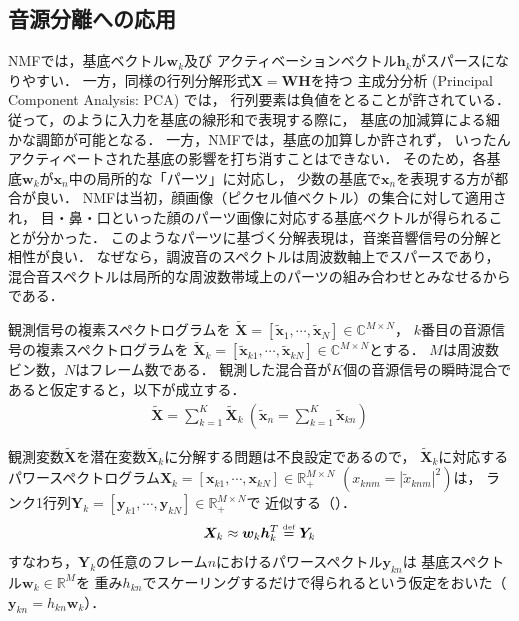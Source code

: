 \subsection{音源分離への応用}
\label{sec:nmf_separation}

NMFでは，基底ベクトル$\bm{w}_k$及び
アクティベーションベクトル$\bm{h}_k$がスパースになりやすい．
一方，同様の行列分解形式$\bm{X} = \bm{W}\bm{H}$を持つ
主成分分析 (Principal Component Analysis: PCA) では，
行列要素は負値をとることが許されている．
従って，のように入力を基底の線形和で表現する際に，
基底の加減算による細かな調節が可能となる．
一方，NMFでは，基底の加算しか許されず，
いったんアクティベートされた基底の影響を打ち消すことはできない．
そのため，各基底$\bm{w}_k$が$\bm{x}_n$中の局所的な「パーツ」に対応し，
少数の基底で$\bm{x}_n$を表現する方が都合が良い．
NMFは当初，顔画像（ピクセル値ベクトル）の集合に対して適用され，
目・鼻・口といった顔のパーツ画像に対応する基底ベクトルが得られることが分かった．
このようなパーツに基づく分解表現は，音楽音響信号の分解と相性が良い．
なぜなら，調波音のスペクトルは周波数軸上でスパースであり，
混合音スペクトルは局所的な周波数帯域上のパーツの組み合わせとみなせるからである．

観測信号の複素スペクトログラムを
$\tilde{\bm{X}} = [\tilde{\bm{x}}_1,\cdots,\tilde{\bm{x}}_N] \in \mathbb{C}^{M \times N}$，
$k$番目の音源信号の複素スペクトログラムを
$\tilde{\bm{X}}_k = [\tilde{\bm{x}}_{k1},\cdots,\tilde{\bm{x}}_{kN}] \in \mathbb{C}^{M \times N}$とする．
$M$は周波数ビン数，$N$はフレーム数である．
観測した混合音が$K$個の音源信号の瞬時混合であると仮定すると，以下が成立する．
\begin{align}
 \tilde{\bm{X}} = \sum_{k=1}^{K} \tilde{\bm{X}}_{k}
 \ 
 \left(
 \tilde{\bm{x}}_n = \sum_{k=1}^{K} \tilde{\bm{x}}_{kn}
 \right)
 \label{eqn:s}
\end{align}

観測変数$\tilde{\bm{X}}$を潜在変数$\tilde{\bm{X}}_k$に分解する問題は不良設定であるので，
$\tilde{\bm{X}}_k$に対応する
パワースペクトログラム$\bm{X}_k = [\bm{x}_{k1},\cdots,\bm{x}_{kN}] 
\in \mathbb{R}_+^{M \times N}$ $(x_{knm} = |\tilde{x}_{knm}|^2)$は，
ランク1行列$\bm{Y}_k = [\bm{y}_{k1},\cdots,\bm{y}_{kN}] \in \mathbb{R}_+^{M \times N}$で
近似する（\reffig{fig:nmf}）．
\begin{align}
 \bm{X}_k \approx \bm{w}_k \bm{h}_k^T \overset{\mbox{\tiny def}}{=} \bm{Y}_k
 \label{eqn:rank1}
\end{align}
すなわち，$\bm{Y}_k$の任意のフレーム$n$におけるパワースペクトル$\bm{y}_{kn}$は
基底スペクトル$\bm{w}_k \in \mathbb{R}^{M}$を
重み$h_{kn}$でスケーリングするだけで得られるという仮定をおいた（$\bm{y}_{kn} = h_{kn} \bm{w}_k$）．


